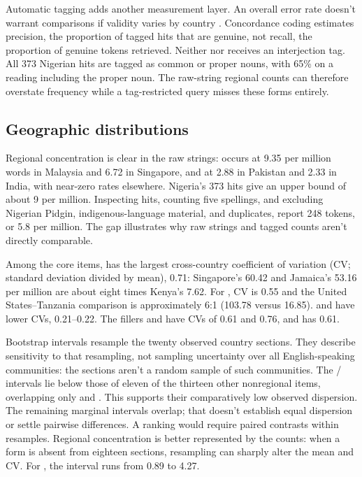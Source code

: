 \documentclass[12pt]{article}
\begin{document}
Automatic tagging adds another measurement layer. An overall error rate doesn't warrant comparisons if validity varies by country \citep{reynolds2026didcorpus}. Concordance coding estimates precision, the proportion of tagged hits that are genuine, not recall, the proportion of genuine tokens retrieved. Neither  nor  receives an interjection tag. All 373 Nigerian  hits are tagged as common or proper nouns, with 65\% on a reading including the proper noun. The raw-string regional counts can therefore overstate frequency while a tag-restricted query misses these forms entirely.

\subsection{Geographic distributions}

Regional concentration is clear in the raw strings:  occurs at 9.35 per million words in Malaysia and 6.72 in Singapore, and  at 2.88 in Pakistan and 2.33 in India, with near-zero rates elsewhere. Nigeria's 373  hits give an upper bound of about 9 per million. Inspecting hits, counting five spellings, and excluding Nigerian Pidgin, indigenous-language material, and duplicates, \textcite[69]{unuabonahdaniel2020} report 248 tokens, or 5.8 per million. The gap illustrates why raw strings and tagged counts aren't directly comparable.

Among the core items,  has the largest cross-country coefficient of variation (CV; standard deviation divided by mean), 0.71: Singapore's 60.42 and Jamaica's 53.16 per million are about eight times Kenya's 7.62. For , CV is 0.55 and the United States--Tanzania comparison is approximately 6:1 (103.78 versus 16.85).  and  have lower CVs, 0.21--0.22. The fillers  and  have CVs of 0.61 and 0.76, and  has 0.61.

Bootstrap intervals resample the twenty observed country sections. They describe sensitivity to that resampling, not sampling uncertainty over all English-speaking communities: the sections aren't a random sample of such communities. The / intervals lie below those of eleven of the thirteen other nonregional items, overlapping only  and . This supports their comparatively low observed dispersion. The remaining marginal intervals overlap; that doesn't establish equal dispersion or settle pairwise differences. A ranking would require paired contrasts within resamples. Regional concentration is better represented by the counts: when a form is absent from eighteen sections, resampling can sharply alter the mean and CV. For , the interval runs from 0.89 to 4.27.
\end{document}
